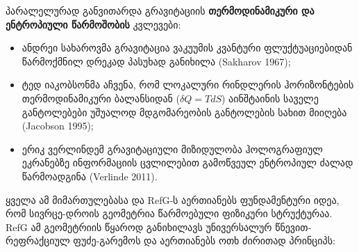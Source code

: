 \documentclass[11pt,a4paper]{article}
\begin{document}
პარალელურად განვითარდა გრავიტაციის \textbf{თერმოდინამიკური და ენტროპიული წარმოშობის} კვლევები:

\begin{itemize}
\item ანდრეი სახაროვმა გრავიტაცია ვაკუუმის კვანტური ფლუქტუაციებიდან წარმოქმნილ დრეკად პასუხად განიხილა (Sakharov 1967);
\item ტედ იაკობსონმა აჩვენა, რომ ლოკალური რინდლერის ჰორიზონტების თერმოდინამიკური ბალანსიდან ($\delta Q = T dS$) აინშტაინის საველე განტოლებები უშუალოდ მდგომარეობის განტოლების სახით მიიღება (Jacobson 1995);
\item ერიკ ვერლინდემ გრავიტაციული მიზიდულობა ჰოლოგრაფიულ ეკრანებზე ინფორმაციის ცვლილებით გამოწვეულ ენტროპიულ ძალად წარმოადგინა (Verlinde 2011).

\end{itemize}
ყველა ამ მიმართულებასა და RefG-ს აერთიანებს ფუნდამენტური იდეა, რომ სივრცე-დროის გეომეტრია წარმოებული ფიზიკური სტრუქტურაა. RefG ამ გეომეტრიის წყაროდ განიხილავს უნივერსალურ წნევით-რეფრაქციულ ფუძე-გარემოს და აერთიანებს ოთხ ძირითად პრინციპს:
\end{document}
